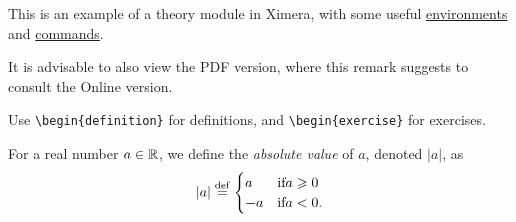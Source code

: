 \documentclass{ximera}
\begin{document}
    \author{Wim Obbels}
    \label{xim:ximeraDemo}

This is an example of a theory module in Ximera, 
with some useful \hyperref[xim:ximeraEnvironments]{environments} and \hyperref[xim:ximeraCommands]{commands}.

\begin{onlineOnly}
 \begin{remark}
    It is advisable to also view the PDF version, 
    where this remark suggests to consult the Online version.
 \end{remark}
\end{onlineOnly}

Use \verb|\begin{definition}| for definitions, and \verb|\begin{exercise}| for exercises.

\begin{definition}\label{showcase:absolutevalue}\nl 

	For a real number $a\in\mathbb{R}$, we define the \textit{absolute value} of $a$, denoted $|a|$, as
	\[
		|a| \overset{\mathrm{def}}{=} \begin{cases}
				         a  & \text{if} a \geqslant 0 \\
				        -a  & \text{if} a<0.
			        \end{cases}
	\]
\end{definition}
\end{document}
